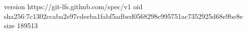 version https://git-lfs.github.com/spec/v1
oid sha256:7c1302ccaba2e97cdeeba1fabf5adbed0568298c995751ac7352925d68e9be8e
size 189513
